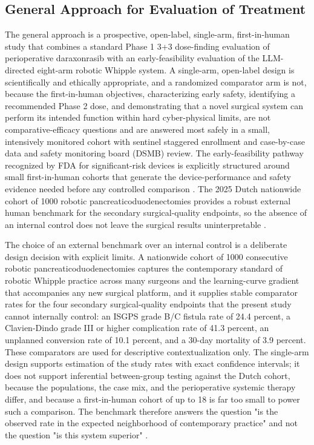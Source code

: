 \subsection{General Approach for Evaluation of Treatment}

The general approach is a prospective, open-label, single-arm, first-in-human study
that combines a standard Phase 1 3+3 dose-finding evaluation of perioperative
daraxonrasib with an early-feasibility evaluation of the LLM-directed eight-arm
robotic Whipple system. A single-arm, open-label design is scientifically and
ethically appropriate, and a randomized comparator arm is not, because the
first-in-human objectives, characterizing early safety, identifying a recommended
Phase 2 dose, and demonstrating that a novel surgical system can perform its
intended function within hard cyber-physical limits, are not comparative-efficacy
questions and are answered most safely in a small, intensively monitored cohort with
sentinel staggered enrollment and case-by-case data and safety monitoring board
(DSMB) review. The early-feasibility pathway recognized by FDA for significant-risk
devices is explicitly structured around small first-in-human cohorts that generate
the device-performance and safety evidence needed before any controlled comparison
\cite{phase1guidance}. The 2025 Dutch nationwide cohort of 1000 robotic
pancreaticoduodenectomies provides a robust external human benchmark for the
secondary surgical-quality endpoints, so the absence of an internal control does not
leave the surgical results uninterpretable \cite{daraxwhipple}.

The choice of an external benchmark over an internal control is a deliberate design
decision with explicit limits. A nationwide cohort of 1000 consecutive robotic
pancreaticoduodenectomies captures the contemporary standard of robotic Whipple
practice across many surgeons and the learning-curve gradient that accompanies any
new surgical platform, and it supplies stable comparator rates for the four
secondary surgical-quality endpoints that the present study cannot internally
control: an ISGPS grade B/C fistula rate of 24.4 percent, a Clavien-Dindo grade III
or higher complication rate of 41.3 percent, an unplanned conversion rate of 10.1
percent, and a 30-day mortality of 3.9 percent. These comparators are used for
descriptive contextualization only. The single-arm design supports estimation of the
study rates with exact confidence intervals; it does not support inferential
between-group testing against the Dutch cohort, because the populations, the
case mix, and the perioperative systemic therapy differ, and because a first-in-human
cohort of up to 18 is far too small to power such a comparison. The benchmark
therefore answers the question "is the observed rate in the expected neighborhood of
contemporary practice" and not the question "is this system superior"
\cite{daraxwhipple,phase1guidance}.

